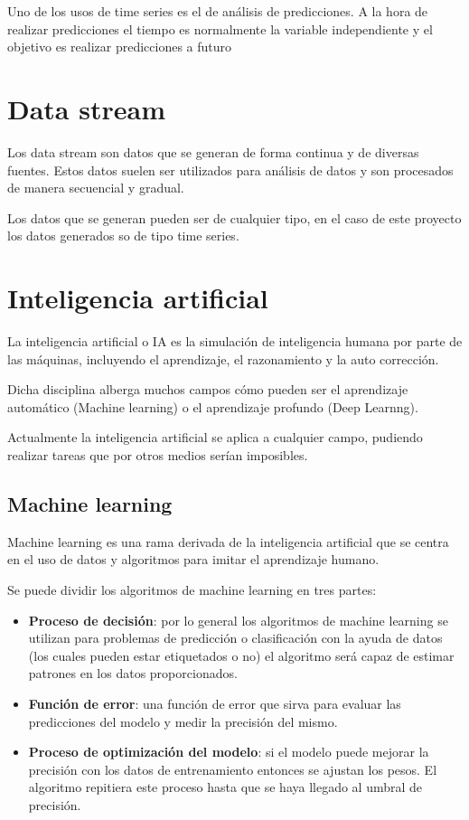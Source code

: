 Uno de los usos de time series es el de análisis de predicciones. A la hora de realizar predicciones el tiempo es normalmente la variable independiente y el objetivo es realizar predicciones a futuro \cite{pagina:toward_data_scince}

\section{Data stream}

Los data stream son datos que se generan de forma continua y de diversas fuentes. Estos datos suelen ser utilizados para análisis de datos y son procesados de manera secuencial y gradual.

Los datos que se generan pueden ser de cualquier tipo, en el caso de este proyecto los datos generados so de tipo time series.\cite{pagina:AWS_dataStream}


\section{Inteligencia artificial}

La inteligencia artificial o IA es la simulación de inteligencia humana por parte de las máquinas, incluyendo el aprendizaje, el razonamiento y la auto corrección.

Dicha disciplina alberga muchos campos cómo pueden ser el aprendizaje automático (Machine learning) o el aprendizaje profundo (Deep Learnng).

Actualmente la inteligencia artificial se aplica a cualquier campo, pudiendo realizar tareas que por otros medios serían imposibles.\cite{pagina:techtarget}  

\subsection{Machine learning}

Machine learning es una rama derivada de la inteligencia artificial que se centra en el uso de datos y algoritmos para imitar el aprendizaje humano. \cite{pagina:IBM_Machine_learning}

Se puede dividir los algoritmos de machine learning en tres partes:

\begin{itemize}
    \item \textbf{Proceso de decisión}: por lo general los algoritmos de machine learning se utilizan para problemas de predicción o clasificación con la ayuda de datos (los cuales pueden estar etiquetados o no) el algoritmo será capaz de estimar patrones en los datos proporcionados.
    \item \textbf{Función de error}: una función de error que sirva para evaluar las predicciones del modelo y medir la precisión del mismo.
    
    \item \textbf{Proceso de optimización del modelo}: si el modelo puede mejorar la precisión con los datos de entrenamiento entonces se ajustan los pesos. El algoritmo repitiera este proceso hasta que se haya llegado al umbral de precisión.

\end{itemize}




